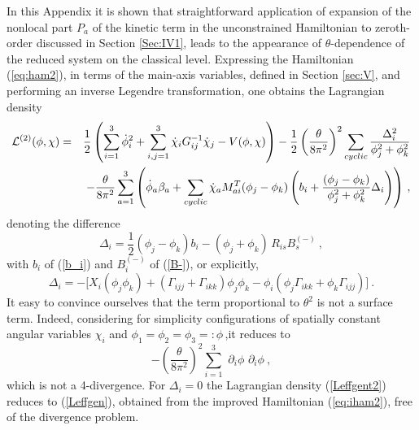 \documentclass[a4paper,12pt]{article}
\newcommand{\nn}{\nonumber}
\begin{document}
In this Appendix it is shown that straightforward application of expansion
of the nonlocal part $P_a$ of the kinetic term in the unconstrained Hamiltonian
to zeroth-order discussed in Section \ref{Sec:IV1}, leads to the
appearance of $\theta$-dependence of the reduced system on the classical level.
Expressing the Hamiltonian (\ref{eq:ham2}), in terms of the main-axis variables,
defined in Section \ref{sec:V}, and performing an
inverse Legendre transformation, one obtains the Lagrangian density
\begin{eqnarray}
\label{Leffgent2}
{\cal L}^{(2)}(\phi, \chi)&=&\frac{1}{2}\left(\sum_{i=1}^{3}\dot{\phi}_i^2+
\sum_{i,j =1}^{3}\dot{\chi}_iG^{-1}_{ij}\dot{\chi}_j
  - V(\phi, \chi)\right)- \frac{1}{2}\left(\frac{\theta}{8\pi^2}\right)^2
  \sum_{cyclic}\frac{\Delta^2_i}{\phi^2_j+\phi^2_k}\nn\\ &&-
\frac{\theta}{8\pi^2}\sum_{a=1}^3\left( \dot{\phi}_a \beta_a
+\sum_{cyclic}\dot{\chi}_a
M^{T}_{ai}(\phi_j-\phi_k)\left(b_i+
\frac{(\phi_j-\phi_k)}{\phi^2_j+\phi^2_k}\Delta_i\right)\right)\,,
\end{eqnarray}
denoting the difference
\begin{equation}
\Delta_i=\frac{1}{2}(\phi_j-\phi_k)b_i-(\phi_j+\phi_k)\,R_{is}B^{(-)}_s~,
\end{equation}
with $b_i$ of (\ref{b_i}) and $B^{(-)}_i$ of (\ref{B-}),
or explicitly,
\begin{equation}
\Delta_i=
-\big[X_i(\phi_j\phi_k)+(\Gamma_{ijj}+\Gamma_{ikk})\phi_j\phi_k
-\phi_i(\phi_j\Gamma_{ikk}+\phi_k\Gamma_{ijj})\big]~.
\end{equation}
It easy to convince ourselves that the term proportional to $\theta^2$
is not a surface term. Indeed, considering for simplicity configurations of
spatially constant angular variables $\chi_i$ and
$\phi_1=\phi_2=\phi_3=:\phi\,$,it reduces to
\begin{equation}
-\left(\frac{\theta}{8\pi^2}\right)^2\sum_{i=1}^{3}\,\,
\partial_i\phi\,\, \partial_i\phi~,
\end{equation}
which is not a 4-divergence.
For $\Delta_i=0$ the Lagrangian density
(\ref{Leffgent2}) reduces to (\ref{Leffgen}), obtained
from the improved  Hamiltonian (\ref{eq:iham2}),
free of the divergence problem.
\end{document}
